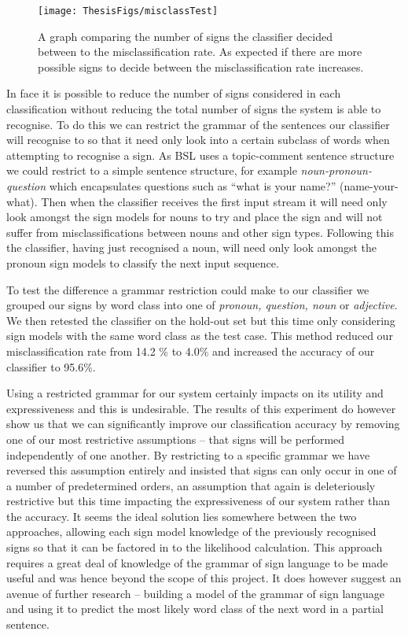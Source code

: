 \begin{figure}[t]
        \centering
        \texttt{[image: ThesisFigs/misclassTest]}
        \caption{A graph comparing the number of signs the classifier decided between to the misclassification rate. As expected if there are more possible signs to decide between the misclassification rate increases.}\label{fig:misclassTest}
\end{figure}

In face it is possible to reduce the number of signs considered in each classification without reducing the total number of signs the system is able to recognise. To do this we can restrict the grammar of the sentences our classifier will recognise to so that it need only look into a certain subclass of words when attempting to recognise a sign. As BSL uses a topic-comment sentence structure we could restrict to a simple sentence structure, for example \emph{noun-pronoun-question} which encapsulates questions such as ``what is your name?'' (name-your-what). Then when the classifier receives the first input stream it will need only look amongst the sign models for nouns to try and place the sign and will not suffer from misclassifications between nouns and other sign types. Following this the classifier, having just recognised a noun, will need only look amongst the pronoun sign models to classify the next input sequence. 

To test the difference a grammar restriction could make to our classifier we grouped our signs by word class into one of \emph{pronoun, question, noun} or \emph{adjective}. We then retested the classifier on the hold-out set but this time only considering sign models with the same word class as the test case. This method reduced our misclassification rate from 14.2 \% to 4.0\% and increased the accuracy of our classifier to 95.6\%.

Using a restricted grammar for our system certainly impacts on its utility and expressiveness and this is undesirable. The results of this experiment do however show us that we can significantly improve our classification accuracy by removing one of our most restrictive assumptions -- that signs will be performed independently of one another. By restricting to a specific grammar we have reversed this assumption entirely and insisted that signs can only occur in one of a number of predetermined orders, an assumption that again is deleteriously restrictive but this time impacting the expressiveness of our system rather than the accuracy. It seems the ideal solution lies somewhere between the two approaches, allowing each sign model knowledge of the previously recognised signs so that it can be factored in to the likelihood calculation. This approach requires a great deal of knowledge of the grammar of sign language to be made useful and was hence beyond the scope of this project. It does however suggest an avenue of further research -- building a model of the grammar of sign language and using it to predict the most likely word class of the next word in a partial sentence.


